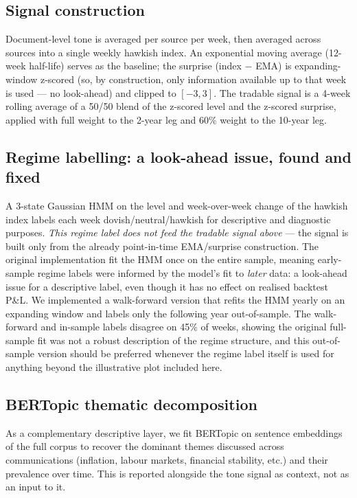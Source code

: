 \documentclass[11pt]{article}
\begin{document}
\subsection{Signal construction}

Document-level tone is averaged per source per week, then averaged across
sources into a single weekly hawkish index. An exponential moving average
(12-week half-life) serves as the baseline; the surprise (index $-$ EMA) is
expanding-window z-scored (so, by construction, only information available
up to that week is used --- no look-ahead) and clipped to $[-3, 3]$. The
tradable signal is a 4-week rolling average of a 50/50 blend of the
z-scored level and the z-scored surprise, applied with full weight to the
2-year leg and 60\% weight to the 10-year leg.

\subsection{Regime labelling: a look-ahead issue, found and fixed}

A 3-state Gaussian HMM on the level and week-over-week change of the
hawkish index labels each week dovish/neutral/hawkish for descriptive and
diagnostic purposes. \emph{This regime label does not feed the tradable
signal above} --- the signal is built only from the already point-in-time
EMA/surprise construction. The original implementation fit the HMM once on
the entire sample, meaning early-sample regime labels were informed by
the model's fit to \emph{later} data: a look-ahead issue for a
descriptive label, even though it has no effect on realised backtest P\&L.
We implemented a walk-forward version that refits the HMM yearly on an
expanding window and labels only the following year out-of-sample. The
walk-forward and in-sample labels disagree on 45\% of weeks, showing the
original full-sample fit was not a robust description of the regime
structure, and this out-of-sample version should be preferred whenever the
regime label itself is used for anything beyond the illustrative plot
included here.

\subsection{BERTopic thematic decomposition}

As a complementary descriptive layer, we fit BERTopic
\citep{grootendorst2022bertopic} on sentence embeddings of the full corpus
to recover the dominant themes discussed across communications (inflation,
labour markets, financial stability, etc.) and their prevalence over time.
This is reported alongside the tone signal as context, not as an input to
it.
\end{document}
